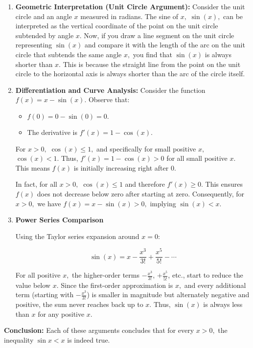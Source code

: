 \documentclass[a4paper,12pt]{book}
\begin{document}
\begin{enumerate}
\item 
\textbf{Geometric Interpretation (Unit Circle Argument):}\newline
Consider the unit circle and an angle \(x\) measured in radians. The sine of \(x,\) \(\sin(x),\) can be interpreted as the vertical coordinate of the point on the unit circle subtended by angle \(x.\) Now, if you draw a line segment on the unit circle representing \(\sin(x)\) and compare it with the length of the arc on the unit circle that subtends the same angle \(x,\) you find that \(\sin(x)\) is always shorter than \(x.\) This is because the straight line from the point on the unit circle to the horizontal axis is always shorter than the arc of the circle itself.

\item 
\textbf{Differentiation and Curve Analysis:}\newline
Consider the function \(f(x) = x - \sin(x).\) Observe that:
\begin{itemize}
\item 
\(f(0) = 0 - \sin(0) = 0.\)

\item 
The derivative is \(f'(x) = 1 - \cos(x).\)

\end{itemize}

For \(x > 0,\) \(\cos(x) \le 1,\) and specifically for small positive \(x,\) \(\cos(x) < 1.\) Thus, \(f'(x) = 1 - \cos(x) > 0\) for all small positive \(x.\) This means \(f(x)\) is initially increasing right after \(0.\)

In fact, for all \(x > 0,\) \(\cos(x) \le 1\) and therefore \(f'(x) \ge 0.\) This ensures \(f(x)\) does not decrease below zero after starting at zero. Consequently, for \(x > 0,\) we have \(f(x) = x - \sin(x) > 0,\) implying \(\sin(x) < x.\)

\item 
\textbf{Power Series Comparison}

Using the Taylor series expansion around \(x = 0:\)

\[
\sin(x) = x - \frac{x^3}{3!} + \frac{x^5}{5!} - \cdots
\]

For all positive \(x,\) the higher-order terms \(-\frac{x^3}{3!}\), \(+\frac{x^5}{5!}\), etc., start to reduce the value below \(x.\) Since the first-order approximation is \(x,\) and every additional term (starting with \(-\frac{x^3}{3!}\)) is smaller in magnitude but alternately negative and positive, the sum never reaches back up to \(x.\) Thus, \(\sin(x)\) is always less than \(x\) for any positive \(x.\)

\end{enumerate}

\textbf{Conclusion:}\newline
Each of these arguments concludes that for every \(x > 0,\) the inequality \(\sin x < x\) is indeed true.
\end{document}
